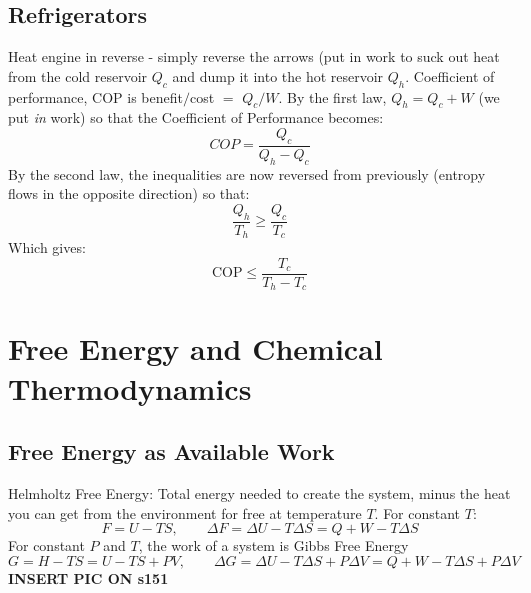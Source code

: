 \documentclass[a4paper,norsk, 10pt]{article}
\begin{document}
\subsection{Refrigerators}
Heat engine in reverse - simply reverse the arrows (put in work to suck out heat from the cold reservoir $Q_c$ and dump it into the hot reservoir $Q_h$. Coefficient of performance, COP is benefit$/$cost $=$ $Q_c/W$. By the first law, $Q_h=Q_c+W$ (we put \textit{in} work) so that the Coefficient of Performance becomes:
\begin{equation}
COP=\frac{Q_c}{Q_h-Q_c}
\end{equation}
By the second law, the inequalities are now reversed from previously (entropy flows in the opposite direction) so that:
\begin{equation}
\frac{Q_h}{T_h}\geq \frac{Q_c}{T_c}
\end{equation}
Which gives:
\begin{equation}
\mathrm{COP}\leq \frac{T_c}{T_h-T_c}
\end{equation}


\section{Free Energy and Chemical Thermodynamics}
\subsection{Free Energy as Available Work}
Helmholtz Free Energy: Total energy needed to create the system, minus the heat you can get from the environment for free at temperature $T$. For constant $T$:
\begin{equation}
F = U - TS, \qquad \Delta F = \Delta U - T\Delta S = Q + W - T\Delta S
\end{equation}
For constant $P$ and $T$, the work of a system is Gibbs Free Energy
\begin{equation}
G = H - TS = U - TS + PV, \qquad \Delta G = \Delta U - T\Delta S + P\Delta V = Q+W -T\Delta S + P\Delta V
\end{equation}
\textbf{INSERT PIC ON s151}
\end{document}
